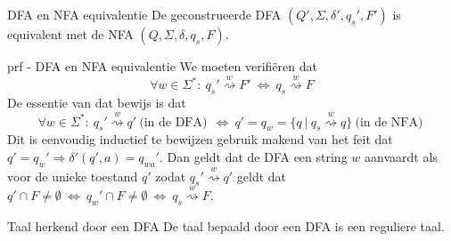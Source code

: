 \begin{lem}{DFA en NFA equivalentie}
    De geconstrueerde DFA $(Q', \Sigma,\delta',q_s',F')$ is equivalent met de NFA $(Q, \Sigma, \delta, q_s, F)$. 
\end{lem}

\begin{prf}{prf - DFA en NFA equivalentie}
    We moeten verifiëren dat 
    \begin{equation*}
        \forall w \in \Sigma^*: \ q_s' \overset{w}{\rightsquigarrow} F' \ \Leftrightarrow \ q_s \overset{w}{\rightsquigarrow} F
    \end{equation*}
    De essentie van dat bewijs is dat 
    \begin{equation*}
        \forall w \in \Sigma^*: \ q_s' \overset{w}{\rightsquigarrow} q' \ \text{(in de DFA)} \ \ \Leftrightarrow \ q' = q_w = \{q \ | \ q_s \overset{w}{\rightsquigarrow} q\} \ \text{(in de NFA)} \
    \end{equation*}
     Dit is eenvoudig inductief te bewijzen gebruik makend van het feit dat $q' = q_w' \Rightarrow \delta'(q',a) = q_{wa}'$. Dan geldt dat de DFA een string $w$ aanvaardt als voor de unieke toestand $q'$ zodat $q_s' \overset{w}{\rightsquigarrow} q'$ geldt dat $q' \cap F \neq \emptyset \ \Leftrightarrow \ q_w' \cap F \neq \emptyset \ \Leftrightarrow \ q_s \overset{w}{\rightsquigarrow} F$.
\end{prf}

\begin{lem}{Taal herkend door een DFA}
    De taal bepaald door een DFA is een reguliere taal.
\end{lem}  

\newpage

